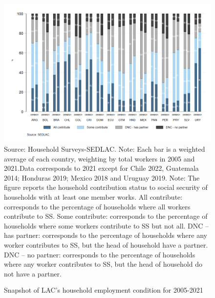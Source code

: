 \documentclass[english]{article}
\begin{document}
\begin{landscape}
\begin{figure}[h!tbp]
    \centering
    \caption{Snapshot of LAC’s household employment condition for 2005-2021}     
    \includegraphics[scale=.45]{latex/figures/Household/snapshot_household_2005-2021.png}
    \label{fig:Household20052021}
    \justifying
    \footnotesize{Source: Household Surveys-SEDLAC.}
    \footnotesize{Note: Each bar is a weighted average of each country, weighting by total workers in 2005 and 2021.Data corresponds to 2021 except for Chile 2022, Guatemala 2014; Honduras 2019; Mexico 2018 and Uruguay 2019.}
    \footnotesize{Note: The figure reports the household contribution status to social security of households with at least one member works.   All contribute: corresponds to the percentage of households where all workers contribute to SS. Some contribute: corresponds to the percentage of households where some workers contribute to SS but not all. DNC – has partner: corresponds to the percentage of households where any worker contributes to SS, but the head of household have a partner. DNC – no partner: corresponds to the percentage of households where any worker contributes to SS, but the head of household do not have a partner.}
\end{figure}
\end{landscape}
\end{document}
